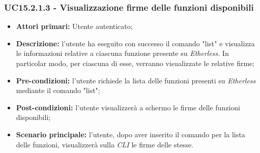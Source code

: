 \subsubsection{UC15.2.1.3 - Visualizzazione firme delle funzioni disponibili}
\begin{itemize}
	\item \textbf{Attori primari:} Utente autenticato;
	\item \textbf{Descrizione:} l'utente ha eseguito con successo il comando "list" e visualizza le informazioni relative a ciascuna funzione presente su \textit{Etherless}. In particolar modo, per ciascuna di esse, verranno visualizzate le relative firme;
	\item \textbf{Pre-condizioni:} l'utente richiede la lista delle funzioni presenti su \textit{Etherless} mediante il comando "list";
	\item \textbf{Post-condizioni:} l'utente visualizzerà a schermo le firme delle funzioni disponibili;
	\item \textbf{Scenario principale:} l'utente, dopo aver inserito il comando per la lista delle funzioni, visualizzerà sulla \textit{CLI\glo} le firme delle stesse.
\end{itemize}
